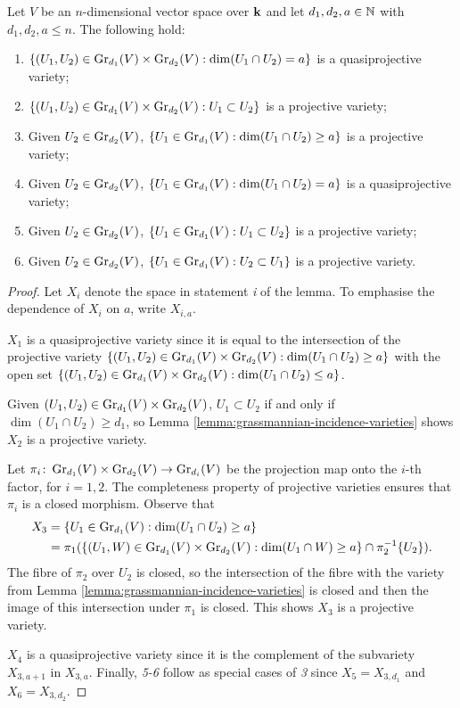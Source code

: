 \documentclass[a4paper, 11pt]{report}
\begin{document}
\begin{lemma}\label{lemma:grassmannian-incidence-lemmas}
Let $V$ be an $n$-dimensional vector space over $\field$ and let $d_1,d_2,a\in\naturals$ with $d_1,d_2,a\le n$. The following hold:
\begin{enumerate}
\item
$\{(U_1,U_2)\in\GR[d_1]{V}\times\GR[d_2]{V}: \dim(U_1\cap U_2) = a\}$ is a quasiprojective variety;
\item
$\{(U_1,U_2)\in\GR[d_1]{V}\times\GR[d_2]{V}: U_1\subset U_2\}$ is a projective variety;
\item
Given $U_2\in\GR[d_2]{V}$, $\{U_1\in\GR[d_1]{V}: \dim(U_1\cap U_2)\geq a\}$ is a projective variety;
\item
Given $U_2\in\GR[d_2]{V}$, $\{U_1\in\GR[d_1]{V}:\dim(U_1\cap U_2) = a\}$ is a quasiprojective variety;
\item
Given $U_2\in\GR[d_2]{V}$, $\{U_1\in\GR[d_1]{V}: U_1\subset U_2\}$ is a projective variety;
\item
Given $U_2\in\GR[d_2]{V}$, $\{U_1\in\GR[d_1]{V}: U_2\subset U_1\}$ is a projective variety.
\end{enumerate}
\end{lemma}

\begin{proof}
Let $X_i$ denote the space in statement \emph{i} of the lemma. To emphasise the dependence of $X_i$ on $a$, write $X_{i,a}$.

$X_1$ is a quasiprojective variety since it is equal to the intersection of the projective variety $\{(U_1,U_2)\in\GR[d_1]{V}\times\GR[d_2]{V}: \dim(U_1\cap U_2)\geq a\}$ with the open set $\{(U_1,U_2)\in\GR[d_1]{V}\times\GR[d_2]{V}: \dim(U_1\cap U_2)\le a\}$.

Given $(U_1,U_2)\in\GR[d_1]{V}\times\GR[d_2]{V}$, $U_1\subset U_2$ if and only if $\dim(U_1\cap U_2)\geq d_1$, so Lemma \ref{lemma:grassmannian-incidence-varieties} shows $X_2$ is a projective variety.

Let $\pi_i\colon\GR[d_1]{V}\times\GR[d_2]{V}\to\GR[d_i]{V}$ be the projection map onto the $i$-th factor, for $i=1,2$. The completeness property of projective varieties ensures that $\pi_i$ is a closed morphism. Observe that
\begin{align*}
X_3 
&= \{U_1\in\GR[d_1]{V}:\dim(U_1\cap U_2)\geq a\}\\
&= \pi_1(\{(U_1,W)\in\GR[d_1]{V}\times\GR[d_2]{V}: \dim(U_1\cap W)\geq a\}\cap\pi_2^{-1}\{U_2\}).
\end{align*}
The fibre of $\pi_2$ over $U_2$ is closed, so the intersection of the fibre with the variety from Lemma \ref{lemma:grassmannian-incidence-varieties} is closed and then the image of this intersection under $\pi_1$ is closed. This shows $X_3$ is a projective variety.

$X_4$ is a quasiprojective variety since it is the complement of the subvariety $X_{3,a+1}$ in $X_{3,a}$. Finally, \emph{5-6} follow as special cases of \emph{3} since $X_5 = X_{3,d_1}$ and $X_6 = X_{3,d_2}$.
\end{proof}
\end{document}
